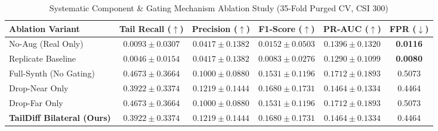 \begin{table}[htbp]
\centering
\caption{Systematic Component \& Gating Mechanism Ablation Study (35-Fold Purged CV, CSI 300)}
\label{tab:ablation}
\begin{tabular}{lccccc}
\hline
\textbf{Ablation Variant} & \textbf{Tail Recall ($\uparrow$)} & \textbf{Precision ($\uparrow$)} & \textbf{F1-Score ($\uparrow$)} & \textbf{PR-AUC ($\uparrow$)} & \textbf{FPR ($\downarrow$)} \\ \hline
No-Aug (Real Only) & $0.0093 \pm 0.0307$ & $0.0417 \pm 0.1382$ & $0.0152 \pm 0.0503$ & $0.1396 \pm 0.1320$ & \textbf{0.0116} \\
Replicate Baseline & $0.0046 \pm 0.0154$ & $0.0417 \pm 0.1382$ & $0.0083 \pm 0.0276$ & $0.1290 \pm 0.1099$ & \textbf{0.0080} \\
Full-Synth (No Gating) & $\mathbf{0.4673 \pm 0.3664}$ & $0.1000 \pm 0.0880$ & $0.1531 \pm 0.1196$ & $\mathbf{0.1712 \pm 0.1893}$ & 0.5073 \\
Drop-Near Only & $0.3922 \pm 0.3374$ & $\mathbf{0.1219 \pm 0.1444}$ & $\mathbf{0.1680 \pm 0.1731}$ & $0.1464 \pm 0.1334$ & 0.4464 \\
Drop-Far Only & $\mathbf{0.4673 \pm 0.3664}$ & $0.1000 \pm 0.0880$ & $0.1531 \pm 0.1196$ & $\mathbf{0.1712 \pm 0.1893}$ & 0.5073 \\
\textbf{TailDiff Bilateral (Ours)} & $0.3922 \pm 0.3374$ & $\mathbf{0.1219 \pm 0.1444}$ & $\mathbf{0.1680 \pm 0.1731}$ & $0.1464 \pm 0.1334$ & 0.4464 \\ \hline
\end{tabular}
\end{table}
